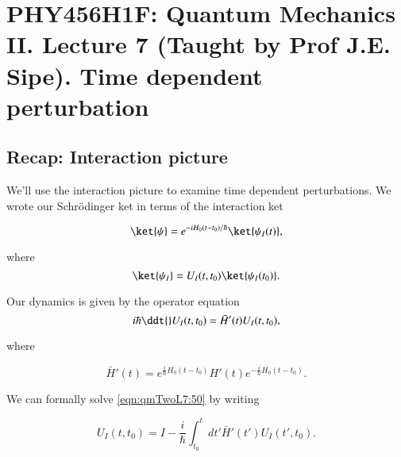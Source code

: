 %
%

\chapter{PHY456H1F: Quantum Mechanics II.  Lecture 7 (Taught by Prof J.E. Sipe).  Time dependent perturbation}
\label{chap:qmTwoL7}
{}
\date{Sept 25, 2011}

\beginArtNoToc

\section{Recap: Interaction picture}

We'll use the interaction picture to examine time dependent perturbations.  We wrote our Schr\"{o}dinger ket in terms of the interaction ket

\begin{equation}\label{eqn:qmTwoL7:10}
\ket{\psi}
= e^{-i H_0 (t - t_0)/\hbar}
\ket{\psi_I(t)},
\end{equation}

where
\begin{equation}\label{eqn:qmTwoL7:30}
\ket{\psi_I}
= U_I(t, t_0) \ket{\psi_I(t_0)}.
\end{equation}

Our dynamics is given by the operator equation
\begin{equation}\label{eqn:qmTwoL7:50}
i \hbar \ddt{} U_I(t, t_0) = \bar{H}'(t) U_I(t, t_0),
\end{equation}

where

\begin{equation}\label{eqn:qmTwoL7:70}
\bar{H}'(t) =
e^{\frac{i}{\hbar} H_0(t - t_0)} H'(t) e^{-\frac{i}{\hbar} H_0(t - t_0)}.
\end{equation}

We can formally solve \ref{eqn:qmTwoL7:50} by writing

\begin{equation}\label{eqn:qmTwoL7:90}
U_I(t, t_0) = I - \frac{i}{\hbar} \int_{t_0}^t dt' \bar{H}'(t') U_I(t', t_0).
\end{equation}


